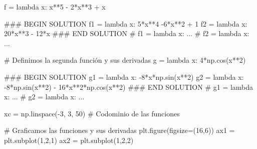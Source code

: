 \documentclass[
  letterpaper,
  DIV=11,
  numbers=noendperiod]{scrreprt}
\newenvironment{Shaded}{\begin{snugshade}}{\end{snugshade}}
\newcommand{\CommentTok}[1]{\textcolor[rgb]{0.37,0.37,0.37}{#1}}
\newcommand{\DecValTok}[1]{\textcolor[rgb]{0.68,0.00,0.00}{#1}}
\newcommand{\KeywordTok}[1]{\textcolor[rgb]{0.00,0.23,0.31}{#1}}
\newcommand{\NormalTok}[1]{\textcolor[rgb]{0.00,0.23,0.31}{#1}}
\newcommand{\OperatorTok}[1]{\textcolor[rgb]{0.37,0.37,0.37}{#1}}
\newcommand{\RegionMarkerTok}[1]{\textcolor[rgb]{0.00,0.23,0.31}{#1}}
\begin{document}
\begin{Shaded}
\begin{Highlighting}[]
\NormalTok{f }\OperatorTok{=} \KeywordTok{lambda}\NormalTok{ x: x}\OperatorTok{**}\DecValTok{5} \OperatorTok{{-}} \DecValTok{2}\OperatorTok{*}\NormalTok{x}\OperatorTok{**}\DecValTok{3} \OperatorTok{+}\NormalTok{ x}

\CommentTok{\#\#\# }\RegionMarkerTok{BEGIN}\CommentTok{ SOLUTION}
\NormalTok{f1 }\OperatorTok{=} \KeywordTok{lambda}\NormalTok{ x: }\DecValTok{5}\OperatorTok{*}\NormalTok{x}\OperatorTok{**}\DecValTok{4} \OperatorTok{{-}}\DecValTok{6}\OperatorTok{*}\NormalTok{x}\OperatorTok{**}\DecValTok{2} \OperatorTok{+} \DecValTok{1}
\NormalTok{f2 }\OperatorTok{=} \KeywordTok{lambda}\NormalTok{ x: }\DecValTok{20}\OperatorTok{*}\NormalTok{x}\OperatorTok{**}\DecValTok{3} \OperatorTok{{-}} \DecValTok{12}\OperatorTok{*}\NormalTok{x}
\CommentTok{\#\#\# }\RegionMarkerTok{END}\CommentTok{ SOLUTION}
\CommentTok{\# f1 = lambda x: ...}
\CommentTok{\# f2 = lambda x: ...}

\CommentTok{\# Definimos la segunda función y sus derivadas}
\NormalTok{g }\OperatorTok{=} \KeywordTok{lambda}\NormalTok{ x: }\DecValTok{4}\OperatorTok{*}\NormalTok{np.cos(x}\OperatorTok{**}\DecValTok{2}\NormalTok{)}

\CommentTok{\#\#\# }\RegionMarkerTok{BEGIN}\CommentTok{ SOLUTION}
\NormalTok{g1 }\OperatorTok{=} \KeywordTok{lambda}\NormalTok{ x: }\OperatorTok{{-}}\DecValTok{8}\OperatorTok{*}\NormalTok{x}\OperatorTok{*}\NormalTok{np.sin(x}\OperatorTok{**}\DecValTok{2}\NormalTok{)}
\NormalTok{g2 }\OperatorTok{=} \KeywordTok{lambda}\NormalTok{ x: }\OperatorTok{{-}}\DecValTok{8}\OperatorTok{*}\NormalTok{np.sin(x}\OperatorTok{**}\DecValTok{2}\NormalTok{) }\OperatorTok{{-}} \DecValTok{16}\OperatorTok{*}\NormalTok{x}\OperatorTok{**}\DecValTok{2}\OperatorTok{*}\NormalTok{np.cos(x}\OperatorTok{**}\DecValTok{2}\NormalTok{)}
\CommentTok{\#\#\# }\RegionMarkerTok{END}\CommentTok{ SOLUTION}
\CommentTok{\# g1 = lambda x: ...}
\CommentTok{\# g2 = lambda x: ...}

\NormalTok{xc }\OperatorTok{=}\NormalTok{ np.linspace(}\OperatorTok{{-}}\DecValTok{3}\NormalTok{, }\DecValTok{3}\NormalTok{, }\DecValTok{50}\NormalTok{) }\CommentTok{\# Codominio de las funciones}

\CommentTok{\# Graficamos las funciones y sus derivadas}
\NormalTok{plt.figure(figsize}\OperatorTok{=}\NormalTok{(}\DecValTok{16}\NormalTok{,}\DecValTok{6}\NormalTok{))}
\NormalTok{ax1 }\OperatorTok{=}\NormalTok{ plt.subplot(}\DecValTok{1}\NormalTok{,}\DecValTok{2}\NormalTok{,}\DecValTok{1}\NormalTok{)}
\NormalTok{ax2 }\OperatorTok{=}\NormalTok{ plt.subplot(}\DecValTok{1}\NormalTok{,}\DecValTok{2}\NormalTok{,}\DecValTok{2}\NormalTok{)}


\end{Highlighting}
\end{Shaded}
\end{document}
